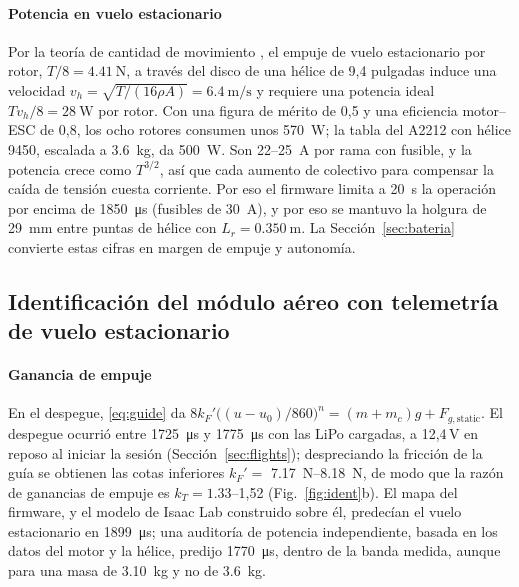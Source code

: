 \paragraph{Potencia en vuelo estacionario}
Por la teoría de cantidad de movimiento \cite{leishman2006}, el empuje de vuelo estacionario por rotor, $T/8=\SI{4.41}{\newton}$, a través del disco de una hélice de 9,4 pulgadas induce una velocidad $v_h=\sqrt{T/(16\rho A)}=\SI{6.4}{\metre\per\second}$ y requiere una potencia ideal $Tv_h/8=\SI{28}{\watt}$ por rotor. Con una figura de mérito de 0,5 y una eficiencia motor--ESC de 0,8, los ocho rotores consumen unos \SI{570}{\watt}; la tabla del A2212 con hélice 9450, escalada a \SI{3.6}{\kilo\gram}, da \SI{500}{\watt}. Son 22--\SI{25}{\ampere} por rama con fusible, y la potencia crece como $T^{3/2}$, así que cada aumento de colectivo para compensar la caída de tensión cuesta corriente. Por eso el firmware limita a \SI{20}{\second} la operación por encima de \SI{1850}{\micro\second} (fusibles de \SI{30}{\ampere}), y por eso se mantuvo la holgura de \SI{29}{\milli\metre} entre puntas de hélice con $L_r=\SI{0.350}{\metre}$. La Sección~\ref{sec:bateria} convierte estas cifras en margen de empuje y autonomía.

\subsection{Identificación del módulo aéreo con telemetría de vuelo estacionario}
\label{sec:ident}

\paragraph{Ganancia de empuje}
En el despegue, \eqref{eq:guide} da $8k_F'\big((u-u_0)/860\big)^n=(m+m_c)g+F_{g,\mathrm{static}}$. El despegue ocurrió entre \SI{1725}{\micro\second} y \SI{1775}{\micro\second} con las LiPo cargadas, a 12,4\,V en reposo al iniciar la sesión (Sección~\ref{sec:flights}); despreciando la fricción de la guía se obtienen las cotas inferiores $k_F'=$ \SIrange{7.17}{8.18}{\newton}, de modo que la razón de ganancias de empuje es $k_T=1.33$--1,52 (Fig.~\ref{fig:ident}b). El mapa del firmware, y el modelo de Isaac Lab construido sobre él, predecían el vuelo estacionario en \SI{1899}{\micro\second}; una auditoría de potencia independiente, basada en los datos del motor y la hélice, predijo \SI{1770}{\micro\second}, dentro de la banda medida, aunque para una masa de \SI{3.10}{\kilo\gram} y no de \SI{3.6}{\kilo\gram}.

